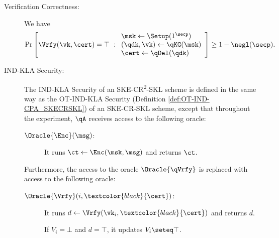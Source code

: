 \begin{definition}
\begin{description}
\item[Verification Correctness:] We have 
\begin{align}
\Pr\left[
\Vrfy(\vk,\cert)=\top
\ :
\begin{array}{ll}
\msk\gets\Setup(1^\secp)\\
(\qdk,\vk)\gets\qKG(\msk)\\
\cert \gets\qDel(\qdk)
\end{array}
\right] 
\ge 1-\negl(\secp).
\end{align}


\end{description}
\end{definition}


\begin{description}
\item[IND-KLA Security:] The IND-KLA Security of an
SKE-CR\textsuperscript{2}-SKL scheme is defined in the same way as
the OT-IND-KLA Security (Definition \ref{def:OT-IND-CPA_SKECRSKL})
of an SKE-CR-SKL scheme, except that throughout the experiment,
$\qA$ receives access to the following oracle:

\begin{description}
\item[ $\Oracle{\Enc}(\msg)$:] It runs $\ct \gets \Enc(\msk,
\msg)$ and returns $\ct$.  

\end{description}

Furthermore, the access to the oracle $\Oracle{\qVrfy}$ is replaced
with access to the following oracle:
\begin{description}
\item[ $\Oracle{\Vrfy}(i, \textcolor{black}{\cert})$:] It runs $d
\gets \Vrfy(\vk_i,\textcolor{black}{\cert})$ and returns $d$.  

If $V_i=\bot$ and $d=\top$, it updates $V_i\seteq \top$. 
\end{description}
\end{description}